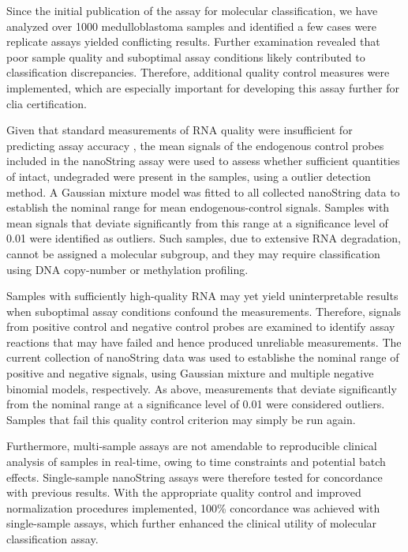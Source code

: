 Since the initial publication of the assay for molecular classification, we have analyzed over 1000 medulloblastoma samples and identified a few cases were replicate assays yielded conflicting results. Further examination revealed that poor sample quality and suboptimal assay conditions likely contributed to classification discrepancies. Therefore, additional quality control measures were implemented, which are especially important for developing this assay further for \gls{clia} certification.

Given that standard measurements of RNA quality were insufficient for predicting assay accuracy , the mean signals of the endogenous control probes included in the nanoString assay were used to assess whether sufficient quantities of intact, undegraded were present in the samples, using a outlier detection method. A Gaussian mixture model was fitted to all collected nanoString data to establish the nominal range for mean endogenous-control signals. Samples with mean signals that deviate significantly from this range at a significance level of 0.01 were identified as outliers. Such samples, due to extensive RNA degradation, cannot be assigned a molecular subgroup, and they may require classification using DNA copy-number or methylation profiling.

Samples with sufficiently high-quality RNA may yet yield uninterpretable results when suboptimal assay conditions confound the measurements. Therefore, signals from positive control and negative control probes are examined to identify assay reactions that may have failed and hence produced unreliable measurements. The current collection of nanoString data was used to establishe the nominal range of positive and negative signals, using Gaussian mixture and multiple negative binomial models, respectively. As above, measurements that deviate significantly from the nominal range at a significance level of 0.01 were considered outliers. Samples that fail this quality control criterion may simply be run again.

Furthermore, multi-sample assays are not amendable to reproducible clinical analysis of samples in real-time, owing to time constraints and potential batch effects. Single-sample nanoString assays were therefore tested for concordance with previous results. With the appropriate quality control and improved normalization procedures implemented, 100\% concordance was achieved with single-sample assays, which further enhanced the clinical utility of molecular classification assay.

